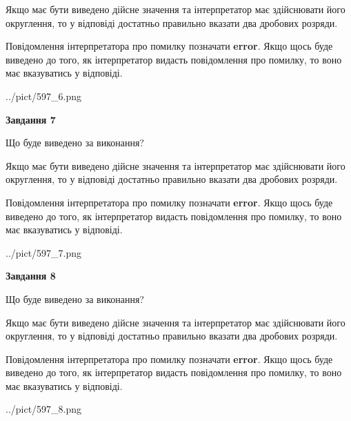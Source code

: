 \documentclass[12pt, ukrainian]{article}
\begin{document}
{\begin {Large}
Якщо має бути виведено дійсне значення та інтерпретатор має здійснювати його округлення, 
то у відповіді достатньо правильно вказати два дробових розряди.

Повідомлення інтерпретатора про помилку позначати \textbf{error}.
Якщо щось буде виведено до того, як інтерпретатор видасть повідомлення про помилку, 
то воно має вказуватись у відповіді. \par

\begin{center}
	{../pict/597_6.png}
\end{center}
\newpage

{\begin {center}\textbf{Завдання 7}\end {center}}\par
Що буде виведено за виконання? \par

Якщо має бути виведено дійсне значення та інтерпретатор має здійснювати його округлення, 
то у відповіді достатньо правильно вказати два дробових розряди.

Повідомлення інтерпретатора про помилку позначати \textbf{error}.
Якщо щось буде виведено до того, як інтерпретатор видасть повідомлення про помилку, 
то воно має вказуватись у відповіді. \par

\begin{center}
	{../pict/597_7.png}
\end{center}
\newpage

{\begin {center}\textbf{Завдання 8}\end {center}}\par
Що буде виведено за виконання? \par

Якщо має бути виведено дійсне значення та інтерпретатор має здійснювати його округлення, 
то у відповіді достатньо правильно вказати два дробових розряди.

Повідомлення інтерпретатора про помилку позначати \textbf{error}.
Якщо щось буде виведено до того, як інтерпретатор видасть повідомлення про помилку, 
то воно має вказуватись у відповіді. \par

\begin{center}
	{../pict/597_8.png}
\end{center}
\newpage


\end{Large}}
\end{document}

